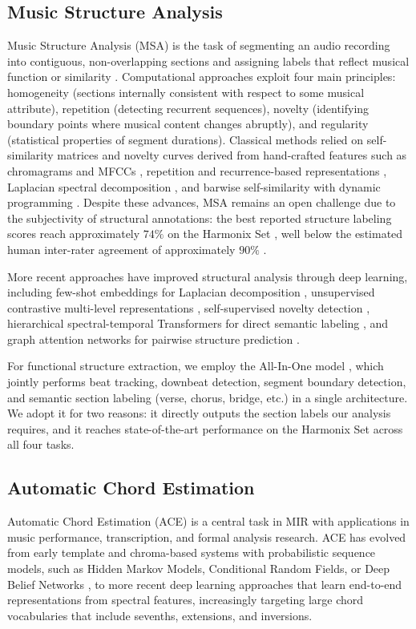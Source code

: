 \documentclass{article}
\newcommand{\rev}[1]{{\color{r2}#1}} %
\begin{document}
\subsection{Music Structure Analysis}
\label{sec:msa}
Music Structure Analysis (MSA) is the task of segmenting an audio recording into contiguous, non-overlapping sections and assigning labels that reflect musical function or similarity \citep{nieto2020audio}. Computational approaches exploit four main principles: homogeneity (sections internally consistent with respect to some musical attribute), repetition (detecting recurrent sequences), novelty (identifying boundary points where musical content changes abruptly), and regularity (statistical properties of segment durations). Classical methods relied on self-similarity matrices and novelty curves derived from hand-crafted features such as chromagrams and MFCCs \citep{foote2000automatic}, repetition and recurrence-based representations \citep{levy2008structural, serra2012unsupervised}, Laplacian spectral decomposition \citep{mcfee2014learning}, and barwise self-similarity with dynamic programming \citep{Marmoret_2023}. Despite these advances, MSA remains an open challenge due to the subjectivity of structural annotations: the best reported structure labeling scores reach approximately $74\%$ on the Harmonix Set \citep{taejun2023allinone}, well below the estimated human inter-rater agreement of approximately $90\%$ \citep{nieto2020audio}.

More recent approaches have improved structural analysis through deep learning, including few-shot embeddings for Laplacian decomposition \citep{salamon2021deep}, unsupervised contrastive multi-level representations \citep{buisson2022learning}, self-supervised novelty detection \citep{peeters2023self}, hierarchical spectral-temporal Transformers for direct semantic labeling \citep{wang2022catch}, and graph attention networks for pairwise structure prediction \citep{buisson2024using}.

For functional structure extraction, we employ the All-In-One model \citep{taejun2023allinone}, which jointly performs beat tracking, downbeat detection, segment boundary detection, and semantic section labeling (verse, chorus, bridge, etc.) in a single architecture. \rev{We adopt it for two reasons: it directly outputs the section labels our analysis requires, and it reaches state-of-the-art performance on the Harmonix Set across all four tasks.}

\subsection{Automatic Chord Estimation}
\label{sec:ace}
Automatic Chord Estimation (ACE) is a central task in MIR with applications in music performance, transcription, and formal analysis research. ACE has evolved from early template and chroma-based systems with probabilistic sequence models, such as Hidden Markov Models, Conditional Random Fields, or Deep Belief Networks \citep{mauch2009simultaneous, ni2012end, humphrey2015four}, to more recent deep learning approaches that learn end-to-end representations from spectral features, increasingly targeting large chord vocabularies that include sevenths, extensions, and inversions.
\end{document}
